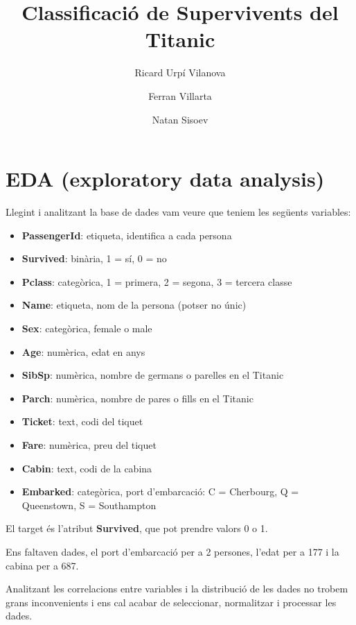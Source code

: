 \documentclass[9pt,a4paper,twoside]{tau-class/tau}
\title{Classificació de Supervivents del Titanic}
\author[a,1]{Ricard Urpí Vilanova}
\author[b,2]{Ferran Villarta}
\author[c,3]{Natan Sisoev}
\affil[a]{1711326}
\affil[b]{1704051}
\affil[c]{1706198}
\begin{document}
    \maketitle 
    \thispagestyle{firststyle} \tauabstract 
    \tableofcontents
    \linenumbers 
    

\section{EDA (exploratory data analysis)}

Llegint i analitzant la base de dades vam veure que teniem les següents variables:

\begin{itemize}
    \item \textbf{PassengerId}: etiqueta, identifica a cada persona
    \item \textbf{Survived}: binària, 1 = sí, 0 = no
    \item \textbf{Pclass}: categòrica, 1 = primera, 2 = segona, 3 = tercera classe
    \item \textbf{Name}: etiqueta, nom de la persona (potser no únic)
    \item \textbf{Sex}: categòrica, female o male
    \item \textbf{Age}: numèrica, edat en anys
    \item \textbf{SibSp}: numèrica, nombre de germans o parelles en el Titanic
    \item \textbf{Parch}: numèrica, nombre de pares o fills en el Titanic
    \item \textbf{Ticket}: text, codi del tiquet
    \item \textbf{Fare}: numèrica, preu del tiquet
    \item \textbf{Cabin}: text, codi de la cabina
    \item \textbf{Embarked}: categòrica, port d'embarcació: C = Cherbourg, Q = Queenstown, S = Southampton
\end{itemize}

El target és l'atribut \textbf{Survived}, que pot prendre valors 0 o 1.

Ens faltaven dades, el port d'embarcació per a 2 persones, l'edat per a 177 i la cabina per a 687.

Analitzant les correlacions entre variables i la distribució de les dades no trobem grans inconvenients i ens cal acabar de seleccionar, normalitzar i processar les dades.
\end{document}
